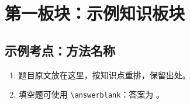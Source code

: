 \section{第一板块：示例知识板块}

\subsection{示例考点：方法名称}

\begin{enumerate}
  \item 题目原文放在这里，按知识点重排，保留出处。 
  \vspace{2.5cm}

  \item 填空题可使用 \verb|\answerblank|：答案为 \answerblank{}。 
  \vspace{2.5cm}
\end{enumerate}
